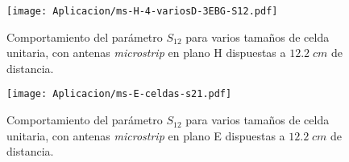 \begin{figure}[h]
	\centering
	\texttt{[image: Aplicacion/ms-H-4-variosD-3EBG-S12.pdf]}
	\caption{Comportamiento del parámetro $S_{12}$ para varios tamaños de celda unitaria, con antenas \textit{microstrip} en plano H dispuestas a $12.2\; cm$ de distancia.}
	\label{fig:ms-H-4-variosD-3EBG-S12}
\end{figure}

\begin{figure}[h]
	\centering
	\texttt{[image: Aplicacion/ms-E-celdas-s21.pdf]}
	\caption{Comportamiento del parámetro $S_{12}$ para varios tamaños de celda unitaria, con antenas \textit{microstrip} en plano E dispuestas a $12.2\; cm$ de distancia.}
	\label{fig:ms-E-celdas-s21}
\end{figure}
